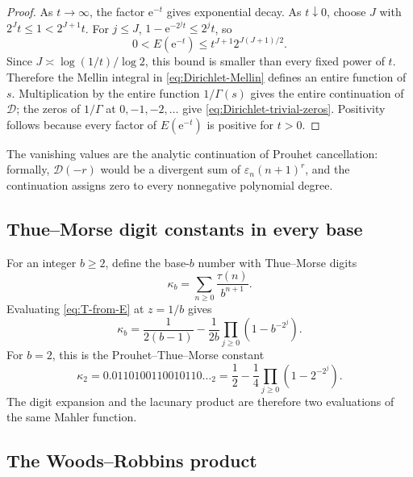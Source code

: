 \documentclass[11pt,oneside]{article}
\theoremstyle{definition}
\theoremstyle{remark}
\newcommand{\e}{\mathrm e}
\newcommand{\eps}{\varepsilon}
\begin{document}
\begin{proof}
As \(t\to\infty\), the factor \(\e^{-t}\) gives exponential decay.  As \(t\downarrow0\),
choose \(J\) with \(2^Jt\le1<2^{J+1}t\).  For \(j\le J\),
\(1-\e^{-2^jt}\le2^jt\), so
\[
  0<E(\e^{-t})
  \le t^{J+1}2^{J(J+1)/2}.
\]
Since \(J\asymp\log(1/t)/\log2\), this bound is smaller than every fixed power of \(t\).
Therefore the Mellin integral in \eqref{eq:Dirichlet-Mellin} defines an entire function of
\(s\).  Multiplication by the entire function \(1/\Gamma(s)\) gives the entire continuation
of \(\mathcal D\); the zeros of \(1/\Gamma\) at \(0,-1,-2,\ldots\) give
\eqref{eq:Dirichlet-trivial-zeros}.  Positivity follows because every factor of
\(E(\e^{-t})\) is positive for \(t>0\).
\end{proof}

The vanishing values are the analytic continuation of Prouhet cancellation: formally,
\(\mathcal D(-r)\) would be a divergent sum of \(\eps_n(n+1)^r\), and the continuation
assigns zero to every nonnegative polynomial degree.

\subsection{Thue--Morse digit constants in every base}

For an integer \(b\ge2\), define the base-\(b\) number with Thue--Morse digits
\begin{equation}
  \kappa_b=\sum_{n\ge0}\frac{\tau(n)}{b^{n+1}}.            \label{eq:kappa-b}
\end{equation}
Evaluating \eqref{eq:T-from-E} at \(z=1/b\) gives
\begin{equation}
  \boxed{
  \kappa_b=\frac1{2(b-1)}-\frac1{2b}
  \prod_{j\ge0}\left(1-b^{-2^j}\right).}                 \label{eq:kappa-b-product}
\end{equation}
For \(b=2\), this is the Prouhet--Thue--Morse constant
\begin{equation}
  \kappa_2=0.0110100110010110\ldots{}_2
  =\frac12-\frac14\prod_{j\ge0}\left(1-2^{-2^j}\right).  \label{eq:PTM-constant}
\end{equation}
The digit expansion and the lacunary product are therefore two evaluations of the same
Mahler function.

\subsection{The Woods--Robbins product}
\end{document}
